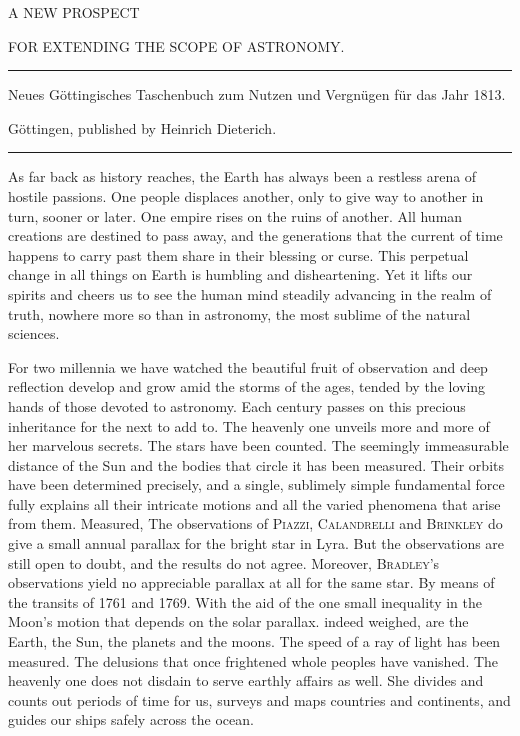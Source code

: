 \clearpage{}%
\begin{center}
{\small A NEW PROSPECT\par
FOR EXTENDING THE SCOPE OF ASTRONOMY.\par}
\medskip\hrule\medskip
{\small Neues Göttingisches Taschenbuch zum Nutzen und Vergnügen für das Jahr 1813.\par
Göttingen, published by Heinrich Dieterich.\par}
\medskip\hrule
\end{center}\medskip
As far back as history reaches, the Earth has always been a restless arena of hostile passions. One people displaces another, only to give way to another in turn, sooner or later. One empire rises on the ruins of another. All human creations are destined to pass away, and the generations that the current of time happens to carry past them share in their blessing or curse. This perpetual change in all things on Earth is humbling and disheartening. Yet it lifts our spirits and cheers us to see the human mind steadily advancing in the realm of truth, nowhere more so than in astronomy, the most sublime of the natural sciences.

For two millennia we have watched the beautiful fruit of observation and deep reflection develop and grow amid the storms of the ages, tended by the loving hands of those devoted to astronomy. Each century passes on this precious inheritance for the next to add to. The heavenly one unveils more and more of her marvelous secrets. The stars have been counted. The seemingly immeasurable distance of the Sun and the bodies that circle it has been measured. Their orbits have been determined precisely, and a single, sublimely simple fundamental force fully explains all their intricate motions and all the varied phenomena that arise from them. Measured,
\expandafter\def\csname HistoricalNoteText13\endcsname{The observations of \textsc{Piazzi}, \textsc{Calandrelli} and \textsc{Brinkley} do give a small annual parallax for the bright star in Lyra. But the observations are still open to doubt, and the results do not agree. Moreover, \textsc{Bradley}’s observations yield no appreciable parallax at all for the same star.}%
\expandafter\def\csname HistoricalNoteText14\endcsname{By means of the transits of 1761 and 1769.}%
\expandafter\def\csname HistoricalNoteText15\endcsname{With the aid of the one small inequality in the Moon’s motion that depends on the solar parallax.}%
%
indeed weighed, are the Earth, the Sun, the planets and the moons. The speed of a ray of light has been measured. The delusions that once frightened whole peoples have vanished. The heavenly one does not disdain to serve earthly affairs as well. She divides and counts out periods of time for us, surveys and maps countries and continents, and guides our ships safely across the ocean.

